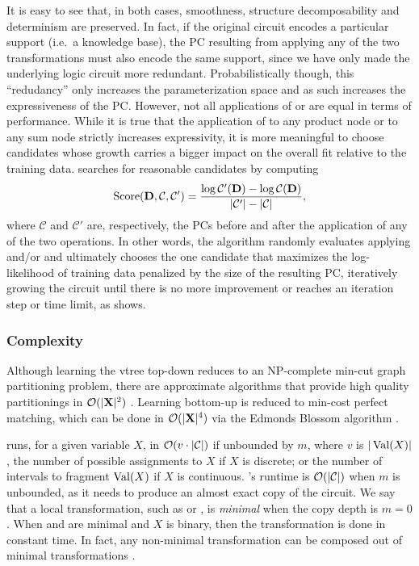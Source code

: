 It is easy to see that, in both cases, smoothness, structure decomposability and determinism are
preserved. In fact, if the original circuit encodes a particular support (i.e.\ a knowledge base),
the PC resulting from applying any of the two transformations must also encode the same support,
since we have only made the underlying logic circuit more redundant. Probabilistically though, this
``redudancy'' only increases the parameterization space and as such increases the expressiveness of
the PC. However, not all applications of  or  are equal in terms of
performance. While it is true that the application of  to any product node or
 to any sum node strictly increases expressivity, it is more meaningful to choose
candidates whose growth carries a bigger impact on the overall fit relative to the training data.
 searches for reasonable candidates by computing
\begin{equation*}
  \operatorname{\normalfont{Score}}(\mathbf{D}, \mathcal{C}, \mathcal{C}')=\frac{\log\mathcal{C}'(\mathbf{D})-\log
  \mathcal{C}(\mathbf{D})}{|\mathcal{C}'|-|\mathcal{C}|},
\end{equation*}
where $\mathcal{C}$ and $\mathcal{C}'$ are, respectively, the PCs before and after the application
of any of the two operations. In other words, the algorithm randomly evaluates applying
 and/or  and ultimately chooses the one candidate that maximizes
the log-likelihood of training data penalized by the size of the resulting PC, iteratively growing
the circuit until there is no more improvement or reaches an iteration step or time limit, as
 shows.

\subsubsection{Complexity}

Although learning the vtree top-down reduces to an NP-complete min-cut graph partitioning problem,
there are approximate algorithms that provide high quality partitionings in $\mathcal{O}(|\mathbf{X}|^2)$
\citep{karypsis98}. Learning bottom-up is reduced to min-cost perfect matching, which can be done
in $\mathcal{O}(|\mathbf{X}|^4)$ via the Edmonds Blossom algorithm \citep{edmonds65,kolmogorov09}.

 runs, for a given variable $X$, in $\mathcal{O}(v\cdot|\mathcal{C}|)$ if unbounded
by $m$, where $v$ is $|\operatorname*{\normalfont{Val}}(X)|$, the number of possible assignments to $X$ if $X$ is discrete; or
the number of intervals to fragment $\operatorname*{\normalfont{Val}}(X)$ if $X$ is continuous. 's runtime is
$\mathcal{O}(|\mathcal{C}|)$ when $m$ is unbounded, as it needs to produce an almost exact copy of
the circuit. We say that a local transformation, such as  or , is
\emph{minimal} when the copy depth is $m=0$. When  and  are minimal
and $X$ is binary, then the transformation is done in constant time. In fact, any non-minimal
transformation can be composed out of minimal transformations \citep{liang17}.

